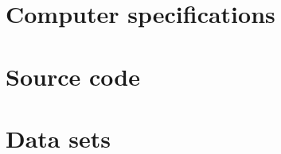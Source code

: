 \chapter{Computer specifications}
\label{computerSpecifications}


\chapter{Source code}
\label{sourceCode}


\chapter{Data sets}
\label{dataSets}
